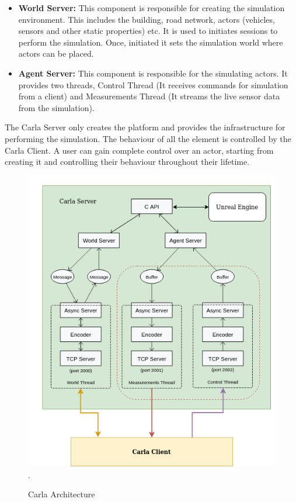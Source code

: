 \begin{itemize}
    \item \textbf{World Server: } This component is responsible for creating the simulation environment. This includes the building, road network, actors (vehicles, sensors and other static properties) etc. It is used to initiates sessions to perform the simulation. Once, initiated it sets the simulation world where actors can be placed.
    \item \textbf{Agent Server: } This component is responsible for the simulating actors. It provides two threads, Control Thread (It receives commands for simulation from a client) and   Measurements Thread (It streams the live sensor data from the simulation).
\end{itemize}

The Carla Server only creates the platform and provides the infrastructure for performing the simulation. The behaviour of all the element is controlled by the Carla Client. A user can gain complete control over an actor, starting from creating it and controlling their behaviour throughout their lifetime. 

\begin{figure}[h!]
    \centering
    \includegraphics[width=12cm]{Framework/Images/carlaArc.png}.
    \caption{Carla Architecture \cite{carla_simulator_2020}}
    \label{carc}
\end{figure}

